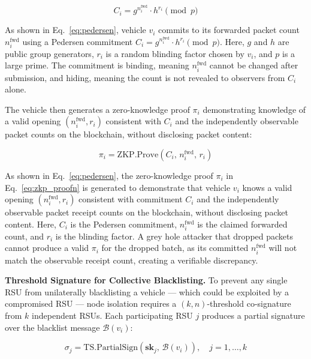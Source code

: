 \documentclass[12pt, a4paper]{report}
\begin{document}
\begin{equation}
\label{eq:pedersen}
C_i = g^{n_i^{\text{fwd}}} \cdot h^{r_i} \pmod{p}
\end{equation}

As shown in Eq.~\eqref{eq:pedersen}, vehicle $v_i$ commits to its forwarded packet count $n_i^{\text{fwd}}$ using a Pedersen commitment $C_i = g^{n_i^{\text{fwd}}} \cdot h^{r_i} \pmod{p}$. Here, $g$ and $h$ are public group generators, $r_i$ is a random blinding factor chosen by $v_i$, and $p$ is a large prime. The commitment is binding, meaning $n_i^{\text{fwd}}$ cannot be changed after submission, and hiding, meaning the count is not revealed to observers from $C_i$ alone.

The vehicle then generates a zero-knowledge proof $\pi_i$ demonstrating
knowledge of a valid opening $(n_i^{\text{fwd}}, r_i)$ consistent with $C_i$
and the independently observable packet counts on the blockchain, without
disclosing packet content:

\begin{equation}
\label{eq:zkp_proof}
\pi_i = \mathrm{ZKP.Prove}\!\left(C_i,\, n_i^{\text{fwd}},\, r_i\right)
\end{equation}

As shown in Eq.~\eqref{eq:pedersen}, the zero-knowledge proof $\pi_i$ in Eq.~\eqref{eq:zkp_proofn} is generated to demonstrate that vehicle $v_i$ knows a valid opening $(n_i^{\text{fwd}}, r_i)$ consistent with commitment $C_i$ and the independently observable packet receipt counts on the blockchain, without disclosing packet content. Here, $C_i$ is the Pedersen commitment, $n_i^{\text{fwd}}$ is the claimed forwarded count, and $r_i$ is the blinding factor. A grey hole attacker that dropped packets cannot produce a valid $\pi_i$ for the dropped batch, as its committed $n_i^{\text{fwd}}$ will not match the observable receipt count, creating a verifiable discrepancy.

\textbf{Threshold Signature for Collective Blacklisting.}
To prevent any single RSU from unilaterally blacklisting a vehicle — which
could be exploited by a compromised RSU — node isolation requires a
$(k,n)$-threshold co-signature from $k$ independent RSUs. Each participating
RSU $j$ produces a partial signature over the blacklist message $\mathcal{B}(v_i)$:

\begin{equation}
\label{eq:threshold_partial}
\sigma_j = \mathrm{TS.PartialSign}\!\left(\mathbf{sk}_j,\, \mathcal{B}(v_i)\right),
\quad j = 1,\ldots,k
\end{equation}
\end{document}
